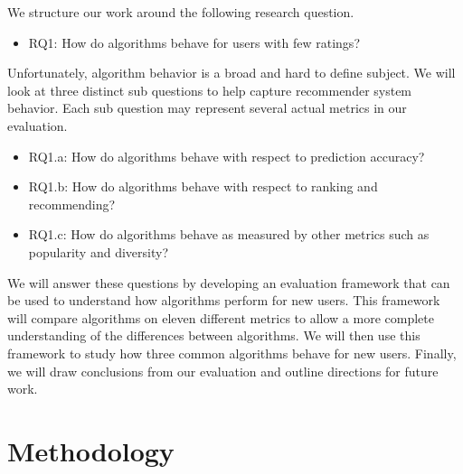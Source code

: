\documentclass[letterpaper]{sig-alternate}
\begin{document}
  We structure our work around the following research question.
  \begin{itemize}
    \item RQ1: How do algorithms behave for users with few ratings?
  \end{itemize}
  Unfortunately, algorithm behavior is a broad and hard to define subject.
  We will look at three distinct sub questions to help capture recommender system behavior.
  Each sub question may represent several actual metrics in our evaluation.

      
  \begin{itemize}
  \item RQ1.a: How do algorithms behave with respect to prediction accuracy?
  \item RQ1.b: How do algorithms behave with respect to ranking and recommending?
  \item RQ1.c: How do algorithms behave as measured by other metrics such as popularity and diversity?
  \end{itemize}

  We will answer these questions by developing an evaluation framework that can be used to understand how algorithms perform for new users.
  This framework will compare algorithms on eleven different metrics to allow a more complete understanding of the differences between algorithms.
  We will then use this framework to study how three common algorithms behave for new users.
  Finally, we will draw conclusions from our evaluation and outline directions for future work.

\section{Methodology}
\label{sec:methodology}
\end{document}
